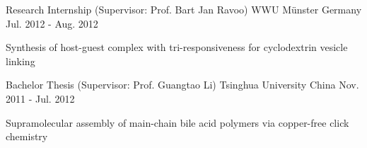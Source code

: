 \begin{cventries}
\cventry
{Research Internship (Supervisor: Prof. Bart Jan Ravoo)} %
{WWU M\"{u}nster} %
{Germany} %
{Jul. 2012 - Aug. 2012} %
{
  \begin{cvitems}
  \item Synthesis of host-guest complex with tri-responsiveness for
    cyclodextrin vesicle linking
  \end{cvitems}
}

\cventry
{Bachelor Thesis (Supervisor: Prof.  Guangtao Li)} %
{Tsinghua University} %
{China} %
{Nov. 2011 - Jul. 2012} %
{
  \begin{cvitems}
  \item Supramolecular assembly of main-chain bile acid polymers via copper-free click chemistry
  \end{cvitems}
}
\end{cventries}

